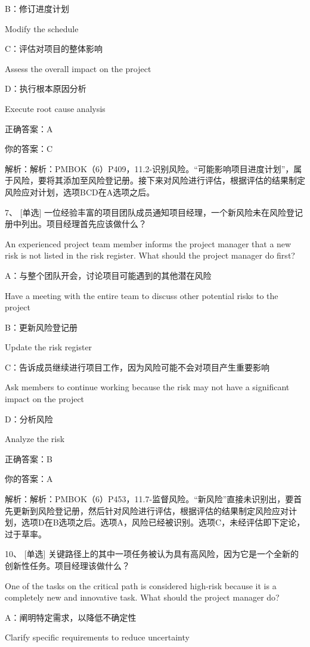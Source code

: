 B：修订进度计划

Modify the schedule

C：评估对项目的整体影响

Assess the overall impact on the project

D：执行根本原因分析

Execute root cause analysis

正确答案：A

你的答案：C

解析：解析：PMBOK（6）P409，11.2-识别风险。“可能影响项目进度计划”，属于风险，要将其添加至风险登记册。接下来对风险进行评估，根据评估的结果制定风险应对计划，选项BCD在A选项之后。

7、 [单选] 一位经验丰富的项目团队成员通知项目经理，一个新风险未在风险登记册中列出。项目经理首先应该做什么？

An experienced project team member informs the project manager that a new risk is not listed in the risk register. What should the project manager do first?

A：与整个团队开会，讨论项目可能遇到的其他潜在风险

Have a meeting with the entire team to discuss other potential risks to the project

B：更新风险登记册

Update the risk register

C：告诉成员继续进行项目工作，因为风险可能不会对项目产生重要影响

Ask members to continue working because the risk may not have a significant impact on the project

D：分析风险

Analyze the risk

正确答案：B

你的答案：A

解析：解析：PMBOK（6）P453，11.7-监督风险。“新风险”直接未识别出，要首先更新到风险登记册，然后针对风险进行评估，根据评估的结果制定风险应对计划，选项D在B选项之后。选项A，风险已经被识别。选项C，未经评估即下定论，过于草率。

10、 [单选] 关键路径上的其中一项任务被认为具有高风险，因为它是一个全新的创新性任务。项目经理该做什么？

One of the tasks on the critical path is considered high-risk because it is a completely new and innovative task. What should the project manager do?

A：阐明特定需求，以降低不确定性

Clarify specific requirements to reduce uncertainty

